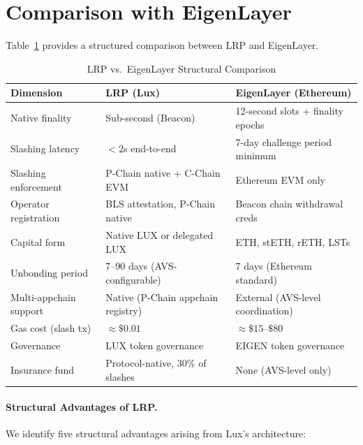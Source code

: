 \section{Comparison with EigenLayer}

\label{sec:comparison}

Table~\ref{tab:eigenlayer} provides a structured comparison between LRP and EigenLayer.

\begin{table}[H]
\centering
\caption{LRP vs.\ EigenLayer Structural Comparison}
\label{tab:eigenlayer}
\begin{tabular}{p{3.5cm}p{4.5cm}p{4.5cm}}
\toprule
\textbf{Dimension} & \textbf{LRP (Lux)} & \textbf{EigenLayer (Ethereum)} \\
\midrule
Native finality & Sub-second (Beacon) & 12-second slots + finality epochs \\
Slashing latency & $< 2$s end-to-end & 7-day challenge period minimum \\
Slashing enforcement & P-Chain native + C-Chain EVM & Ethereum EVM only \\
Operator registration & BLS attestation, P-Chain native & Beacon chain withdrawal creds \\
Capital form & Native LUX or delegated LUX & ETH, stETH, rETH, LSTs \\
Unbonding period & 7--90 days (AVS-configurable) & 7 days (Ethereum standard) \\
Multi-appchain support & Native (P-Chain appchain registry) & External (AVS-level coordination) \\
Gas cost (slash tx) & $\approx\$0.01$ & $\approx\$15$--$\$80$ \\
Governance & LUX token governance & EIGEN token governance \\
Insurance fund & Protocol-native, 30\% of slashes & None (AVS-level only) \\
\bottomrule
\end{tabular}
\end{table}

\paragraph{Structural Advantages of LRP.}
We identify five structural advantages arising from Lux's architecture:

